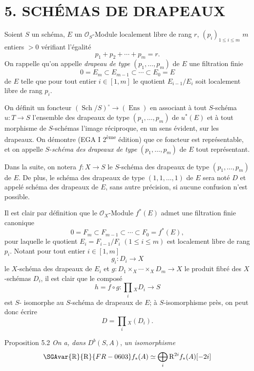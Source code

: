\section*{5. SCHÉMAS DE DRAPEAUX}

Soient $S$ un schéma, $E$ un $\mathcal{O}_S$-Module localement libre de rang $r$, $(p_i)_{1\le i\le m}$ $m$ entiers $>0$ vérifiant l'égalité
\[
p_1+p_2+\cdots+p_m=r.
\]
On rappelle qu'on appelle \emph{drapeau de type} $(p_1,\ldots,p_m)$ de $E$ une filtration finie
\[
0=E_m\subset E_{m-1}\subset\cdots\subset E_0=E
\]
de $E$ telle que pour tout entier $i\in[1,m]$ le quotient $E_{i-1}/E_i$ soit localement libre de rang $p_i$.

On définit un foncteur $(\operatorname{Sch}/S)^\circ\to(\operatorname{Ens})$ en associant à tout $S$-schéma $u:T\to S$ l'ensemble des drapeaux de type $(p_1,\ldots,p_m)$ de $u^*(E)$ et à tout morphisme de $S$-schémas l'image réciproque, en un sens évident, sur les drapeaux. On démontre (EGA I 2\textsuperscript{ème} édition) que ce foncteur est représentable, et on appelle $S$-\emph{schéma des drapeaux de type} $(p_1,\ldots,p_m)$ de $E$ tout représentant.

Dans la suite, on notera $f:X\to S$ le $S$-schéma des drapeaux de type $(p_1,\ldots,p_m)$ de $E$. De plus, le schéma des drapeaux de type $(1,1,\ldots,1)$ de $E$ sera noté $D$ et appelé schéma des drapeaux de $E$, sans autre précision, si aucune confusion n'est possible.

Il est clair par définition que le $\mathcal{O}_X$-Module $f^*(E)$ admet une filtration finie canonique
\[
0=F_m\subset F_{m-1}\subset\cdots\subset F_0=f^*(E),
\]
pour laquelle le quotient $E_i=F_{i-1}/F_i$ $(1\le i\le m)$ est localement libre de rang $p_i$. Notant pour tout entier $i\in[1,m]$
\[
g_i:D_i\to X
\]
le $X$-schéma des drapeaux de $E_i$ et $g:D_1\times_X\cdots\times_X D_m\to X$ le produit fibré des $X$-schémas $D_i$, il est clair que le composé
\[
h=f\circ g:\prod_i{}_XD_i\to S
\tag{5.1}
\]
est $S$-
isomorphe au $S$-schéma de drapeaux de $E$; à $S$-isomorphisme près, on peut donc écrire
\[
D=\prod_i{}_X(D_i).
\]

\begin{statement}{Proposition 5.2}
\emph{On a, dans} $D^b(S,A)$, \emph{un isomorphisme}
\[
\SGAvar{\mathbb{R}}{\mathrm{R}}{FR-0603} f_*(A)\simeq\bigoplus_i \mathrm{R}^{2i}f_*(A)[-2i]
\]
\end{statement}


